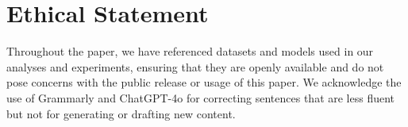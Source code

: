 \section*{Ethical Statement}
Throughout the paper, we have referenced datasets and models used in our analyses and experiments, ensuring that they are openly available and do not pose concerns with the public release or usage of this paper. We acknowledge the use of Grammarly and ChatGPT-4o for correcting sentences that are less fluent but not for generating or drafting new content.